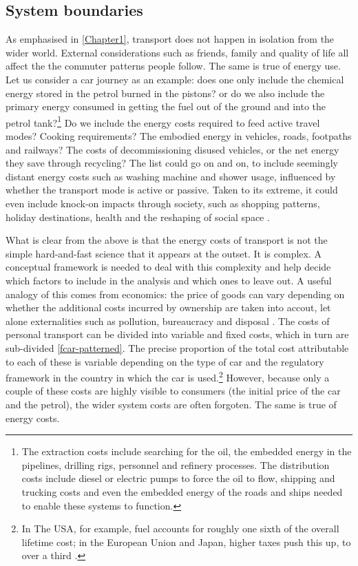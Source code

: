 \subsection{System boundaries} 
As emphasised in \cref{Chapter1}, transport does not happen in isolation from
the wider world. External considerations such as friends, family and quality of
life all affect the the commuter patterns people follow. The same is true of
energy use. Let us consider a car journey as an example: does one only include the
chemical energy stored in the petrol burned in the pistons? or do we also
include the primary energy consumed in getting the fuel out of the ground and
into the petrol tank?\footnote{The extraction costs include
searching for the oil, the embedded energy in the pipelines, drilling rigs,
personnel and refinery processes. The distribution costs include diesel or
electric pumps to force the oil to flow, shipping and trucking costs and even
the embedded energy of the roads and ships needed to enable these systems to
function.}
Do we include the energy costs required to feed active travel modes? Cooking
requirements? The embodied energy in vehicles, roads, footpaths and railways?
The costs of decommissioning disused vehicles, or the net energy they save
through recycling?
The list could go on and on, to include seemingly distant energy costs such as
washing machine and shower usage, influenced by whether the transport mode is
active or passive. Taken to its extreme, it could even include knock-on impacts
through society, such as shopping patterns, holiday destinations, health and
the reshaping of social space \citep{Illich1974}.

What is clear from the above is that the energy costs of transport is not the
simple hard-and-fast science that it appears at the outset. It is complex. A
conceptual framework is needed to deal with this complexity and help decide
which factors to include in the analysis and which ones to leave out.
A useful analogy of this comes from economics: the price of goods can
vary depending on whether the additional costs incurred by ownership
are taken into accout, let alone externalities such as pollution,
bureaucracy and disposal \citep{Perman2003}.
The costs of personal transport can be divided into variable and
fixed costs, which in turn are sub-divided \cref{fcar-patterned}.
The precise proportion of the total cost attributable to each of these
is variable depending on the type of car and the regulatory framework
in the country in which the car is
used.\footnote{In The USA, for example,
fuel accounts for roughly one sixth of the overall lifetime cost;
in the European Union and Japan, higher taxes push this up, to over a
third \citep{Smil1993}.
}
However, because only a couple of these costs are highly
visible to consumers
(the initial price of the car and the petrol), the wider system costs are often
forgoten. The same is true of energy costs. 

